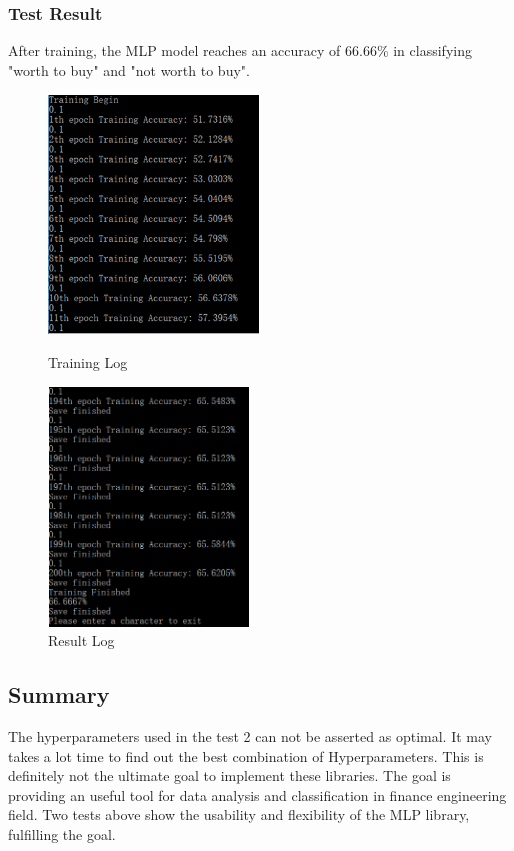 \documentclass[letterpaper]{article}
\begin{document}
\subsubsection{Test Result}
After training, the MLP model reaches an accuracy of 66.66\% in classifying "worth to buy" and "not worth to buy".
\begin{figure}[H]
\begin{minipage}[t]{0.5\textwidth}
\centering
\includegraphics[width=2.2in,height=2.5in]{pro.png}
\caption{Training Log}
\label{fig:side:a}
\end{minipage}%
\begin{minipage}[t]{0.5\textwidth}
\centering
\includegraphics[width=2.1in,height=2.5in]{res.png}
\caption{Result Log}
\label{fig:side:b}
\end{minipage}
\end{figure} 
\subsection{Summary}
The hyperparameters used in the test 2 can not be asserted as optimal. It may takes a lot time to find out the best combination of Hyperparameters. This is definitely not the ultimate goal to implement these libraries. The goal is providing an useful tool for data analysis and classification in finance engineering field. Two tests above show the usability and flexibility of the MLP library, fulfilling the goal.
\end{document}
